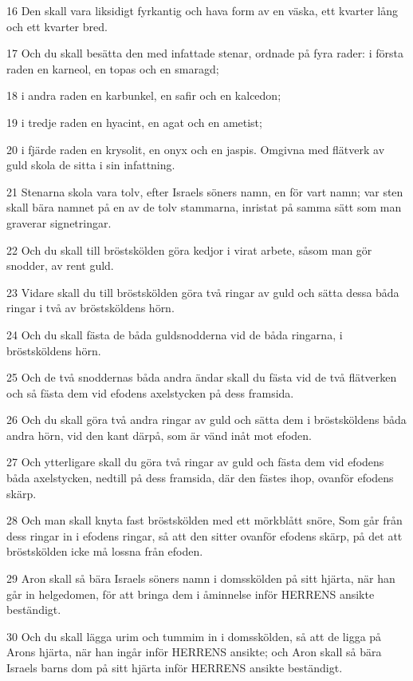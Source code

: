 \par 16 Den skall vara liksidigt fyrkantig och hava form av en väska, ett kvarter lång och ett kvarter bred.
\par 17 Och du skall besätta den med infattade stenar, ordnade på fyra rader: i första raden en karneol, en topas och en smaragd;
\par 18 i andra raden en karbunkel, en safir och en kalcedon;
\par 19 i tredje raden en hyacint, en agat och en ametist;
\par 20 i fjärde raden en krysolit, en onyx och en jaspis. Omgivna med flätverk av guld skola de sitta i sin infattning.
\par 21 Stenarna skola vara tolv, efter Israels söners namn, en för vart namn; var sten skall bära namnet på en av de tolv stammarna, inristat på samma sätt som man graverar signetringar.
\par 22 Och du skall till bröstskölden göra kedjor i virat arbete, såsom man gör snodder, av rent guld.
\par 23 Vidare skall du till bröstskölden göra två ringar av guld och sätta dessa båda ringar i två av bröstsköldens hörn.
\par 24 Och du skall fästa de båda guldsnodderna vid de båda ringarna, i bröstsköldens hörn.
\par 25 Och de två snoddernas båda andra ändar skall du fästa vid de två flätverken och så fästa dem vid efodens axelstycken på dess framsida.
\par 26 Och du skall göra två andra ringar av guld och sätta dem i bröstsköldens båda andra hörn, vid den kant därpå, som är vänd inåt mot efoden.
\par 27 Och ytterligare skall du göra två ringar av guld och fästa dem vid efodens båda axelstycken, nedtill på dess framsida, där den fästes ihop, ovanför efodens skärp.
\par 28 Och man skall knyta fast bröstskölden med ett mörkblått snöre, Som går från dess ringar in i efodens ringar, så att den sitter ovanför efodens skärp, på det att bröstskölden icke må lossna från efoden.
\par 29 Aron skall så bära Israels söners namn i domsskölden på sitt hjärta, när han går in helgedomen, för att bringa dem i åminnelse inför HERRENS ansikte beständigt.
\par 30 Och du skall lägga urim och tummim in i domsskölden, så att de ligga på Arons hjärta, när han ingår inför HERRENS ansikte; och Aron skall så bära Israels barns dom på sitt hjärta inför HERRENS ansikte beständigt.
